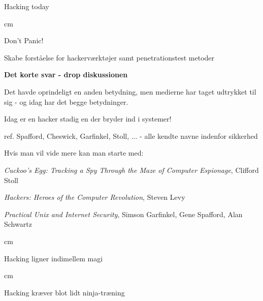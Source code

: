\documentclass[20pt,landscape,a4paper]{foils}
\begin{document}

\mytitlepage
{Hacking today}



 cm


\centerline{\color{titlecolor}\LARGE Don't Panic!}

\begin{list1}
\item Skabe forståelse for hackerværktøjer
  samt penetrationstest metoder
\end{list1}



{\bfseries Det korte svar - drop diskussionen}

Det havde oprindeligt en anden betydning, men medierne har taget
udtrykket til sig - og idag har det begge betydninger.

{\color{red}\hlkbig Idag er en hacker stadig en der bryder ind i systemer!}

ref. Spafford, Cheswick, Garfinkel, Stoll, ...
- alle kendte navne indenfor sikkerhed

Hvis man vil vide mere kan man starte med:
\begin{list2}
\item \emph{Cuckoo's Egg: Tracking a Spy Through the Maze of Computer
 Espionage},  Clifford Stoll
\item \emph{Hackers: Heroes of the Computer Revolution},
Steven Levy
\item \emph{Practical Unix and Internet Security},
Simson Garfinkel, Gene Spafford, Alan Schwartz
\end{list2}





 cm

\centerline{Hacking ligner indimellem  magi}




 cm
\centerline{Hacking kræver blot lidt ninja-træning}

\end{document}
